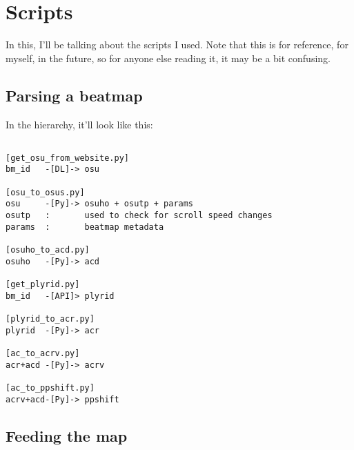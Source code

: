 

\section{Scripts}

In this, I'll be talking about the scripts I used. Note that this is for reference, for myself, in the future, so for anyone else reading it, it may be a bit confusing.

\subsection{Parsing a beatmap}

In the hierarchy, it'll look like this:

\begin{lstlisting}

[get_osu_from_website.py]
bm_id 	-[DL]-> osu

[osu_to_osus.py]
osu  	-[Py]-> osuho + osutp + params
osutp	: 		used to check for scroll speed changes
params	: 		beatmap metadata

[osuho_to_acd.py]
osuho	-[Py]->	acd

[get_plyrid.py]
bm_id	-[API]> plyrid

[plyrid_to_acr.py]
plyrid	-[Py]-> acr

[ac_to_acrv.py]
acr+acd	-[Py]-> acrv

[ac_to_ppshift.py]
acrv+acd-[Py]-> ppshift

\end{lstlisting}

\subsection{Feeding the map}

